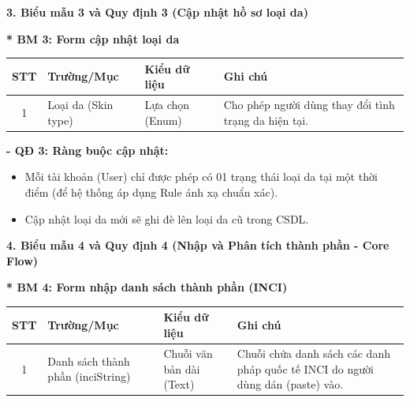 \documentclass[12pt,a4paper]{article}
\begin{document}
\vspace{0.5cm}
\textbf{3. Biểu mẫu 3 và Quy định 3 (Cập nhật hồ sơ loại da)}

\textbf{* BM 3: Form cập nhật loại da}
\begin{center}
\begin{tabular}{|c|p{3.5cm}|p{3.5cm}|p{5cm}|}
\hline
\textbf{STT} & \textbf{Trường/Mục} & \textbf{Kiểu dữ liệu} & \textbf{Ghi chú} \\
\hline
1 & Loại da (Skin type) & Lựa chọn (Enum) & Cho phép người dùng thay đổi tình trạng da hiện tại. \\
\hline
\end{tabular}
\end{center}

\textbf{- QĐ 3: Ràng buộc cập nhật:}
\begin{itemize}
    \item Mỗi tài khoản (User) chỉ được phép có 01 trạng thái loại da tại một thời điểm (để hệ thống áp dụng Rule ánh xạ chuẩn xác).
    \item Cập nhật loại da mới sẽ ghi đè lên loại da cũ trong CSDL.
\end{itemize}

\vspace{0.5cm}
\textbf{4. Biểu mẫu 4 và Quy định 4 (Nhập và Phân tích thành phần - Core Flow)}

\textbf{* BM 4: Form nhập danh sách thành phần (INCI)}
\begin{center}
\begin{tabular}{|c|p{3.5cm}|p{3.5cm}|p{5cm}|}
\hline
\textbf{STT} & \textbf{Trường/Mục} & \textbf{Kiểu dữ liệu} & \textbf{Ghi chú} \\
\hline
1 & Danh sách thành phần (inciString) & Chuỗi văn bản dài (Text) & Chuỗi chứa danh sách các danh pháp quốc tế INCI do người dùng dán (paste) vào. \\
\hline
\end{tabular}
\end{center}
\end{document}
